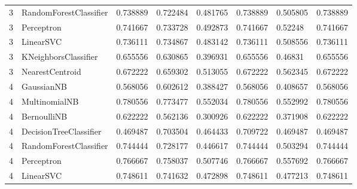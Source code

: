 \documentclass{article}
\begin{document}
\begin{table}[h]
\begin{tabular}{llllllll}
3             & RandomForestClassifier & 0.738889          & 0.722484          & 0.481765              & 0.738889              & 0.505805                 & 0.738889                 \\
3             & Perceptron             & 0.741667          & 0.733728          & 0.492873              & 0.741667              & 0.52248                  & 0.741667                 \\
3             & LinearSVC              & 0.736111          & 0.734867          & 0.483142              & 0.736111              & 0.508556                 & 0.736111                 \\
3             & KNeighborsClassifier   & 0.655556          & 0.630865          & 0.396931              & 0.655556              & 0.46831                  & 0.655556                 \\
3             & NearestCentroid        & 0.672222          & 0.659302          & 0.513055              & 0.672222              & 0.562345                 & 0.672222                 \\
4             & GaussianNB             & 0.568056          & 0.602612          & 0.388427              & 0.568056              & 0.408657                 & 0.568056                 \\
4             & MultinomialNB          & 0.780556          & 0.773477          & 0.552034              & 0.780556              & 0.552992                 & 0.780556                 \\
4             & BernoulliNB            & 0.622222          & 0.562136          & 0.300926              & 0.622222              & 0.371908                 & 0.622222                 \\
4             & DecisionTreeClassifier & 0.469487          & 0.703504          & 0.464433              & 0.709722              & 0.469487                 & 0.469487                 \\
4             & RandomForestClassifier & 0.744444          & 0.728177          & 0.446617              & 0.744444              & 0.503294                 & 0.744444                 \\
4             & Perceptron             & 0.766667          & 0.758037          & 0.507746              & 0.766667              & 0.557692                 & 0.766667                 \\
4             & LinearSVC              & 0.748611          & 0.741632          & 0.472898              & 0.748611              & 0.477213                 & 0.748611                 \\

\end{tabular}
\end{table}
\end{document}
